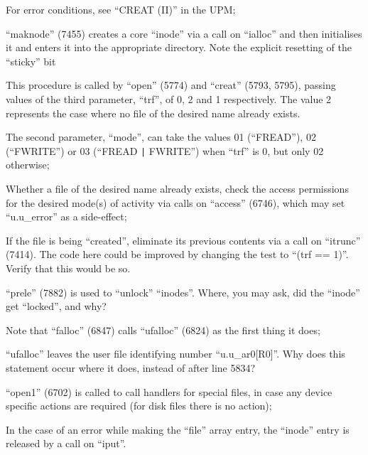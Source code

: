\item[5788:] For error conditions, see ``CREAT
 (II)'' in the UPM;

\item[5790:] ``maknode'' (7455) creates a core
 ``inode'' via a call on ``ialloc''
 and then initialises it and
 enters it into the appropriate
 directory. Note the explicit
 resetting of the ``sticky'' bit
\ed



This procedure is called by ``open''
(5774) and ``creat'' (5793, 5795), passing values of the third parameter,
``trf'', of 0, 2 and 1 respectively. The
value 2 represents the case where no
file of the desired name already
exists.

\bd
\item[5812:] The second parameter, ``mode'', can
 take the values 01 (``FREAD''), 02
(``FWRITE'') or 03 (``FREAD \verb+|+ FWRITE'')
when ``trf'' is 0, but only 02 otherwise;

Whether a file of the desired name
already exists, check the access
permissions for the desired
mode(s) of activity via calls on
``access'' (6746), which may set
``u.u\_error'' as a side-effect;

\item[5824:] If the file is being ``created'',
 eliminate its previous contents
 via a call on ``itrunc'' (7414).
 The code here could be improved
 by changing the test to ``(trf ==
 1)''. Verify that this would be
 so.

\item[5826:] ``prele'' (7882) is used to
 ``unlock'' ``inodes''. Where, you
 may ask, did the ``inode'' get
 ``locked'', and why?

\item[5827:] Note that ``falloc'' (6847) calls
 ``ufalloc'' (6824) as the first
 thing it does;

\item[5831:] ``ufalloc'' leaves
 the user file
identifying number
``u.u\_ar0[R0]''. Why does this
statement occur where it does,
instead of after line 5834?

\item[5832:] ``open1'' (6702) is called to call
 handlers for special files, in
 case any device specific actions
 are required (for disk files
 there is no action);

\item[5839:] In the case of an error while
 making the ``file'' array entry,
 the ``inode'' entry is released by
 a call on ``iput''.
\ed


